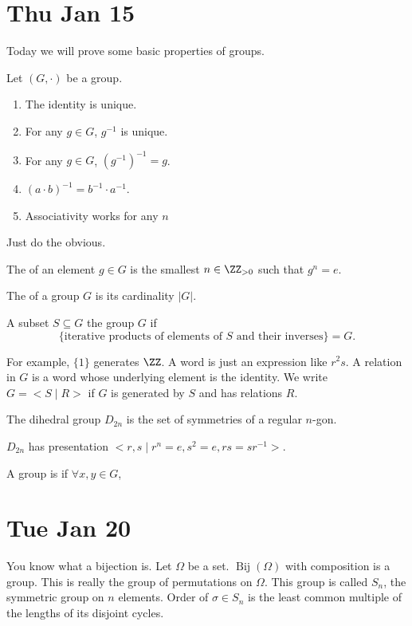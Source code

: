 \documentclass{article}
\DeclareMathOperator{\Bij}{Bij}
\begin{document}
\section{Thu Jan 15}
Today we will prove some basic properties of groups.
\begin{prop}
  Let $(G, \cdot)$ be a group.
  \begin{enumerate}
  \item The identity is unique.
  \item For any $g \in G$, $g^{-1}$ is unique.
  \item For any $g \in G$, $(g^{-1})^{-1} = g$.
  \item $(a \cdot b)^{-1} = b^{-1} \cdot a^{-1}$.
  \item Associativity works for any $n$
  \end{enumerate}
\end{prop}
\proof Just do the obvious.
\begin{definition}
  The  of an element $g \in G$ is the smallest $n \in \ZZ_{>0}$ such that $g^n = e$.

  The  of a group $G$ is its cardinality $|G|$.
\end{definition}

\begin{definition}
  A subset $S \subseteq G$  the group $G$ if 
  \[ \{\text{iterative products of elements of $S$ and their inverses}\} = G.\]
\end{definition}
For example, $\{1\}$ generates $\ZZ$. A word is just an expression like $r^2 s$. A relation in $G$ is a word whose underlying element is the identity. We write $G = <S\mid R>$ if $G$ is generated by $S$ and has relations $R$.
\begin{definition}
  The dihedral group $D_{2n}$ is the set of symmetries of a regular $n$-gon.
\end{definition}
$D_{2n}$ has presentation $<r,s \mid r^n = e, s^2 = e, rs = sr^{-1}>$.
\begin{definition}
  A group is  if $\forall x,y \in G$,
\end{definition}

\section{Tue Jan 20}
You know what a bijection is. Let $\Omega$ be a set. $\Bij(\Omega)$ with composition is a group.
This is really the group of permutations on $\Omega$.
This group is called $S_n$, the symmetric group on $n$ elements.
Order of $\sigma \in S_n$ is the least common multiple of the lengths of its disjoint cycles.
\end{document}
